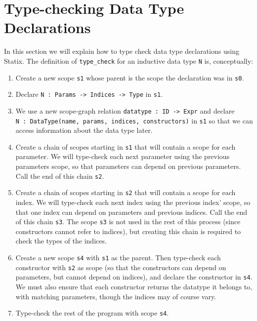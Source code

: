 \section{Type-checking Data Type Declarations}
\label{ch:datatypes:typechecking}
In this section we will explain how to type check data type declarations using Statix.
The definition of \verb|type_check| for an inductive data type \verb|N| is, conceptually:
\begin{enumerate}
	\item Create a new scope \verb|s1| whose parent is the scope the declaration was in \verb|s0|.
	\item \label{name-decl}Declare \verb|N : Params -> Indices -> Type| in \verb|s1|.
	\item \label{datatype-decl}We use a new scope-graph relation \verb|datatype : ID -> Expr| and declare \\ \verb|N : DataType(name, params, indices, constructors)| in \verb|s1| so that we can access information about the data type later.
	
	\item Create a chain of scopes starting in \verb|s1| that will contain a scope for each parameter. We will type-check each next parameter using the previous parameters scope, so that parameters can depend on previous parameters. Call the end of this chain \verb|s2|.
	
	\item Create a chain of scopes starting in \verb|s2| that will contain a scope for each index. We will type-check each next index using the previous index' scope, so that one index can depend on parameters and previous indices. Call the end of this chain \verb|s3|. The scope \verb|s3| is not used in the rest of this process (since constructors cannot refer to indices), but creating this chain is required to check the types of the indices.
	
	\item Create a new scope \verb|s4| with \verb|s1| as the parent. Then type-check each constructor with \verb|s2| as scope (so that the constructors can depend on parameters, but cannot depend on indices), and declare the constructor in \verb|s4|. We must also ensure that each constructor returns the datatype it belongs to, with matching parameters, though the indices may of course vary.
	
	\item Type-check the rest of the program with scope \verb|s4|.
\end{enumerate}
